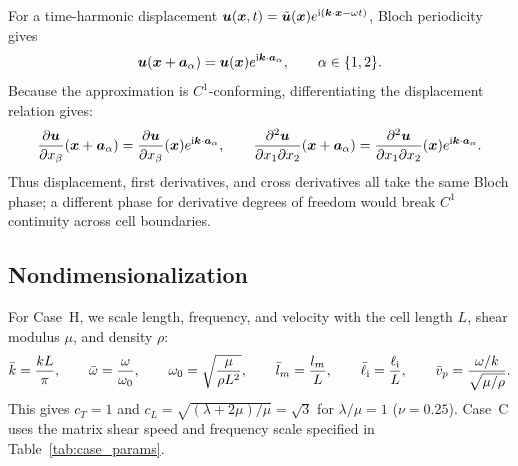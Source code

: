 For a time-harmonic displacement $\bm{u}(\bm{x},t)=\tilde{\bm{u}}(\bm{x})e^{\mathrm{i}(\bm{k}\cdot\bm{x}-\omega t)}$, Bloch periodicity gives
\begin{equation}
\bm{u}(\bm{x}+\bm{a}_\alpha)=\bm{u}(\bm{x})e^{\mathrm{i}\bm{k}\cdot\bm{a}_\alpha},\qquad \alpha\in\{1,2\}.
\label{eq:bloch_displacement}
\end{equation}
Because the approximation is $C^1$-conforming, differentiating the displacement relation gives:
\begin{equation}
\frac{\partial\bm{u}}{\partial x_\beta}(\bm{x}+\bm{a}_\alpha)=\frac{\partial\bm{u}}{\partial x_\beta}(\bm{x})e^{\mathrm{i}\bm{k}\cdot\bm{a}_\alpha},\qquad
\frac{\partial^2\bm{u}}{\partial x_1\partial x_2}(\bm{x}+\bm{a}_\alpha)=\frac{\partial^2\bm{u}}{\partial x_1\partial x_2}(\bm{x})e^{\mathrm{i}\bm{k}\cdot\bm{a}_\alpha}.
\label{eq:bloch_derivatives}
\end{equation}
Thus displacement, first derivatives, and cross derivatives all take the same Bloch phase; a different phase for derivative degrees of freedom would break $C^1$ continuity across cell boundaries.

\subsection{Nondimensionalization}
For Case~H, we scale length, frequency, and velocity with the cell length $L$, shear modulus $\mu$, and density $\rho$:
\begin{equation}
\bar{k}=\frac{kL}{\pi},\qquad \bar{\omega}=\frac{\omega}{\omega_0},\qquad
\omega_0=\sqrt{\frac{\mu}{\rho L^2}},\qquad
\bar{l}_m=\frac{l_m}{L},\qquad
\bar{\ell}_{\mathrm{i}}=\frac{\ell_{\mathrm{i}}}{L},\qquad
\bar{v}_p=\frac{\omega/k}{\sqrt{\mu/\rho}}.
\label{eq:nondim_defs}
\end{equation}
This gives $c_T=1$ and $c_L=\sqrt{(\lambda+2\mu)/\mu}=\sqrt{3}$ for $\lambda/\mu=1$ ($\nu=0.25$). Case~C uses the matrix shear speed and frequency scale specified in Table~\ref{tab:case_params}.

